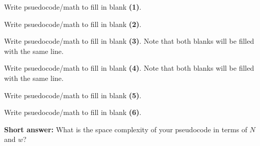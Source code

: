 \documentclass[11pt,addpoints,answers]{exam}
\begin{document}
\begin{questions}
\begin{parts}
\begin{subparts}
    \subpart[1] Write psuedocode/math to fill in blank \textbf{(1)}. 

    \begin{answer_box}[title=, height = 2cm, width=15cm]
    \end{answer_box}
    
    \subpart[1] Write psuedocode/math to fill in blank \textbf{(2)}. 

    \begin{answer_box}[title=, height = 2cm, width=15cm]
    \end{answer_box}

    \subpart[1] Write psuedocode/math to fill in blank \textbf{(3)}. Note that both blanks will be filled with the same line. 
    
    \begin{answer_box}[title=, height = 2cm, width=15cm]
    \end{answer_box}

    \clearpage
    \subpart[1] Write psuedocode/math to fill in blank \textbf{(4)}. Note that both blanks will be filled with the same line. 
    
    \begin{answer_box}[title=, height = 2cm, width=15cm]
    \end{answer_box}

    \subpart[1] Write psuedocode/math to fill in blank \textbf{(5)}.

    \begin{answer_box}[title=, height = 2cm, width=15cm]
    \end{answer_box}

    \subpart[1] Write psuedocode/math to fill in blank \textbf{(6)}. 

    \begin{answer_box}[title=, height = 2cm, width=15cm]
    \end{answer_box}

    

    \subpart[1] \textbf{Short answer:} What is the space complexity of your pseudocode in terms of $N$ and $w$?

    \begin{answer_box}[title=,height=2cm,width=3cm]
    \end{answer_box}


\end{subparts}
\end{parts}
\end{questions}
\end{document}
